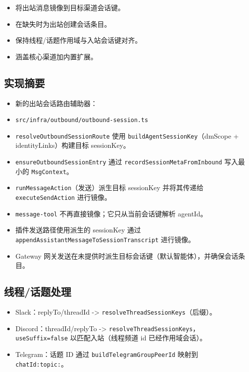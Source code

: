 \begin{itemize}
  \item 将出站消息镜像到目标渠道会话键。
  \item 在缺失时为出站创建会话条目。
  \item 保持线程/话题作用域与入站会话键对齐。
  \item 涵盖核心渠道加内置扩展。
\end{itemize}


\subsection{实现摘要}


\begin{itemize}
  \item 新的出站会话路由辅助器：
  \item \texttt{src/infra/outbound/outbound-session.ts}
  \item \texttt{resolveOutboundSessionRoute} 使用 \texttt{buildAgentSessionKey}（dmScope + identityLinks）构建目标 sessionKey。
  \item \texttt{ensureOutboundSessionEntry} 通过 \texttt{recordSessionMetaFromInbound} 写入最小的 \texttt{MsgContext}。
  \item \texttt{runMessageAction}（发送）派生目标 sessionKey 并将其传递给 \texttt{executeSendAction} 进行镜像。
  \item \texttt{message-tool} 不再直接镜像；它只从当前会话键解析 agentId。
  \item 插件发送路径使用派生的 sessionKey 通过 \texttt{appendAssistantMessageToSessionTranscript} 进行镜像。
  \item Gateway 网关发送在未提供时派生目标会话键（默认智能体），并确保会话条目。
\end{itemize}


\subsection{线程/话题处理}


\begin{itemize}
  \item Slack：replyTo/threadId -> \texttt{resolveThreadSessionKeys}（后缀）。
  \item Discord：threadId/replyTo -> \texttt{resolveThreadSessionKeys}，\texttt{useSuffix=false} 以匹配入站（线程频道 id 已经作用域会话）。
  \item Telegram：话题 ID 通过 \texttt{buildTelegramGroupPeerId} 映射到 \texttt{chatId:topic:}。
\end{itemize}


